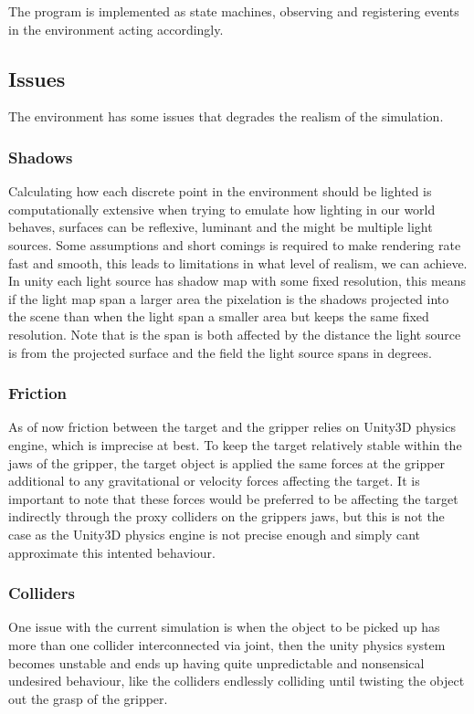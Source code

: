 The program is implemented as state machines, observing and registering events in the environment acting accordingly.





\subsection{Issues}

The environment has some issues that degrades the realism of the simulation. 

\subsubsection{Shadows}

Calculating how each discrete point in the environment should be lighted is computationally extensive when trying to emulate how lighting in our world behaves, surfaces can be reflexive, luminant and the might be multiple light sources. Some assumptions and short comings is required to make rendering rate fast and smooth, this leads to limitations in what level of realism, we can achieve. In unity each light source has shadow map with some fixed resolution, this means if the light map span a larger area the pixelation is the shadows projected into the scene than when the light span a smaller area but keeps the same fixed resolution. Note that is the span is both affected by the distance the light source is from the projected surface and the field the light source spans in degrees. 

\subsubsection{Friction}

As of now friction between the target and the gripper relies on Unity3D physics engine, which is imprecise at best. To keep the target relatively stable within the jaws of the gripper, the target object is applied the same forces at the gripper additional to any gravitational or velocity forces affecting the target. It is important to note that these forces would be preferred to be affecting the target indirectly through the proxy colliders on the grippers jaws, but this is not the case as the Unity3D physics engine is not precise enough and simply cant approximate this intented behaviour.

\subsubsection{Colliders}

One issue with the current simulation is when the object to be picked up has more than one collider interconnected via joint, then the unity physics system becomes unstable and ends up having quite unpredictable and nonsensical undesired behaviour, like the colliders endlessly colliding until twisting the object out the grasp of the gripper.
